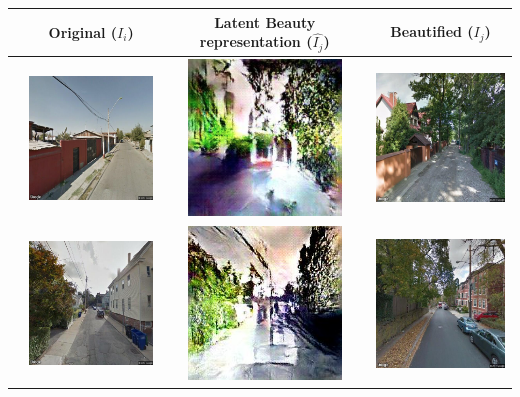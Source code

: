 \begin{table}
    \begin{tabular}{l*3{C}@{}}
        \toprule
        & Original ($I_i$) & Latent Beauty representation ($\hat{I_j}$) & Beautified ($I_j$) \\ 
        \midrule
        & \includegraphics[width=11em]{u_9} & \includegraphics[width=11em]{t_9} &  \includegraphics[width=11em]{b_9} \\ 
        & \includegraphics[width=11em]{u_4.jpeg} & \includegraphics[width=11em]{t_4.jpeg} &  \includegraphics[width=11em]{b_4.jpeg} \\ 

\end{tabular}
\end{table}
